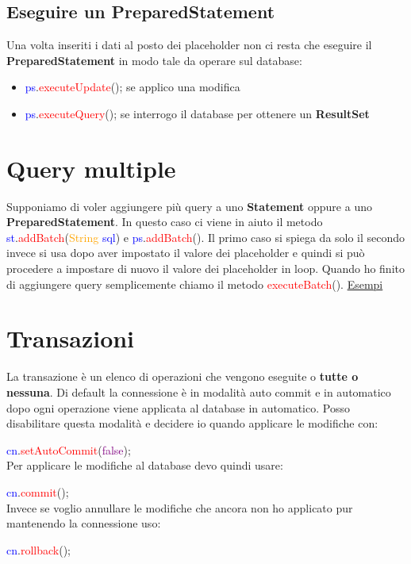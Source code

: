 \documentclass[11pt, letterpaper, titlepage]{article}
\begin{document}
\subsection{Eseguire un PreparedStatement}
Una volta inseriti i dati al posto dei placeholder non ci resta che eseguire il
\textbf{PreparedStatement} in modo tale da operare sul database:\par
\begin{itemize}
    \item \textcolor{blue}{ps}.\textcolor{red}{executeUpdate}(); se applico una modifica
    \item \textcolor{blue}{ps}.\textcolor{red}{executeQuery}(); se interrogo il database per ottenere un \textbf{ResultSet}
\end{itemize}

\section{Query multiple}
Supponiamo di voler aggiungere più query a uno \textbf{Statement} oppure a uno \textbf{PreparedStatement}. In questo caso ci viene in
aiuto il metodo \textcolor{blue}{st}.\textcolor{red}{addBatch}(\textcolor{orange}{String} \textcolor{blue}{sql}) e
\textcolor{blue}{ps}.\textcolor{red}{addBatch}(). Il primo caso si spiega da solo il secondo invece si usa dopo aver impostato
il valore dei placeholder e quindi si può procedere a impostare di nuovo il valore dei placeholder in loop. Quando ho finito di aggiungere
query semplicemente chiamo il metodo \textcolor{red}{executeBatch}(). \href{https://www.baeldung.com/jdbc-batch-processing}{Esempi}

\section{Transazioni}
La transazione è un elenco di operazioni che vengono eseguite o \textbf{tutte o nessuna}.
Di default la connessione è in modalità auto commit e in automatico dopo ogni operazione viene applicata al database
in automatico. Posso disabilitare questa modalità e decidere io quando applicare le modifiche con:\par
\textcolor{blue}{cn}.\textcolor{red}{setAutoCommit}(\textcolor{purple}{false});\\
Per applicare le modifiche al database devo quindi usare:\par
\textcolor{blue}{cn}.\textcolor{red}{commit}();\\
Invece se voglio annullare le modifiche che ancora non ho applicato pur mantenendo la connessione uso:\par
\textcolor{blue}{cn}.\textcolor{red}{rollback}();
\end{document}
